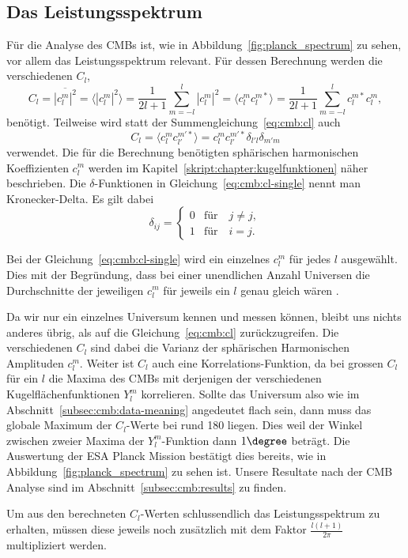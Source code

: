 \subsection{Das Leistungsspektrum\label{subsec:cmb:cl}}

Für die Analyse des CMBs ist, wie in Abbildung~\ref{fig:planck_spectrum} zu 
sehen, vor allem das Leistungsspektrum relevant. Für dessen Berechnung werden 
die verschiedenen $C_l$,
\begin{equation}
	C_l = \overline{|c_l^m|^2} = \langle |c_l^m|^2 \rangle =  \frac{1}{2l + 
	1}\sum_{m=-l}^{l}|c_l^m|^2 = \langle c_l^m 
	c_l^{m*} \rangle = 
	\frac{1}{2l + 
	1}\sum_{m=-l}^{l}c_l^{m*}c_l^m,
	\label{eq:cmb:cl}
\end{equation}
benötigt. Teilweise wird statt der Summengleichung~\eqref{eq:cmb:cl} auch
\begin{equation}
	C_l = \langle c_{l}^{m}c_{l'}^{m'*} \rangle = 
	c_{l}^{m}c_{l'}^{m'*}\delta_{l'l}\delta_{m'm}
	\label{eq:cmb:cl-single}
\end{equation}
verwendet. Die für die Berechnung benötigten sphärischen harmonischen 
Koeffizienten $c_l^m$ werden im Kapitel~\ref{skript:chapter:kugelfunktionen} 
näher beschrieben. Die $\delta$-Funktionen in 
Gleichung~\eqref{eq:cmb:cl-single} nennt man Kronecker-Delta. Es gilt dabei
\begin{equation*}
\delta_{ij} =
\begin{cases}
0 & \text{für} \quad j \neq j, \\
1 & \text{für} \quad i = j.
\end{cases}
\end{equation*}

Bei der Gleichung~\eqref{eq:cmb:cl-single} wird ein einzelnes 
$c_l^m$ für jedes $l$ ausgewählt. Dies mit der Begründung, dass bei einer 
unendlichen Anzahl Universen die Durchschnitte der jeweiligen $c_l^m$ für 
jeweils ein $l$ genau gleich wären \cite{cmb:klauber}.

Da wir nur ein einzelnes Universum kennen und messen können, bleibt uns 
nichts anderes übrig, als auf die Gleichung~\eqref{eq:cmb:cl} zurückzugreifen. 
Die verschiedenen $C_l$ sind dabei die Varianz der sphärischen Harmonischen 
Amplituden $c_l^m$. Weiter ist $C_l$ auch eine Korrelations-Funktion, da bei 
grossen $C_l$ für ein $l$ die Maxima des CMBs mit derjenigen der verschiedenen 
Kugelflächenfunktionen $Y_l^m$ korrelieren. Sollte das Universum also wie im 
Abschnitt~\ref{subsec:cmb:data-meaning} angedeutet flach sein, dann muss das 
globale Maximum der $C_l$-Werte bei rund 180 liegen. Dies weil der Winkel 
zwischen zweier Maxima der $Y_l^m$-Funktion dann $1\degree$ beträgt. Die 
Auswertung der ESA Planck Mission bestätigt dies bereits, wie in 
Abbildung~\ref{fig:planck_spectrum} zu sehen ist. Unsere Resultate nach der CMB 
Analyse sind im Abschnitt~\ref{subsec:cmb:results} zu finden.

Um aus den berechneten $C_l$-Werten schlussendlich das Leistungsspektrum zu 
erhalten, müssen diese jeweils noch zusätzlich mit dem Faktor 
$\frac{l(l+1)}{2\pi}$ multipliziert werden.